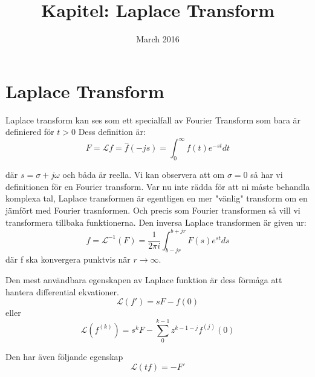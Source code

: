 \documentclass{article}
\title{Kapitel: Laplace Transform}
\author{ }
\date{March 2016}
\begin{document}
\maketitle

\section{Laplace Transform}



Laplace transform kan ses som ett specialfall av Fourier Transform som bara är definiered för $t>0$
Dess definition är:
$$F = \mathcal{L} f = \hat{f}(-js) = \int_{0}^{\infty} f(t)e^{-st} dt $$

där $s = \sigma + j \omega$ och båda är reella. Vi kan observera att om $\sigma = 0$ så har vi definitionen
för en Fourier transform. Var nu inte rädda för att ni måste behandla komplexa tal, Laplace transformen är
egentligen en mer "vänlig" transform om en jämfört med Fourier trasnformen. 
Och precis som Fourier transformen så vill vi transformera tillbaka funktionerna. 
Den inversa Laplace transformen är given ur:
$$f = \mathcal{L}^{-1} (F) = \frac{1}{2 \pi i} \int_{b-jr}^{b+jr} F(s) e^{st} ds $$ 
där f ska konvergera punktvis när $r\rightarrow \infty$.

Den mest användbara egenskapen av Laplace funktion är dess förmåga att hantera differential ekvationer.
$$\mathcal{L} (f') = s F - f(0)$$
eller
$$\mathcal{L} (f^{(k)}) = s^k F - \sum_{0}^{k-1} z^{k-1-j} f^{(j)} (0)$$

Den har även följande egenskap 
$$\mathcal{L} (t f) = -F' $$
\end{document}
